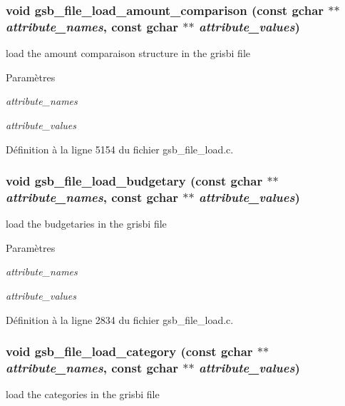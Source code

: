 \subsubsection[{gsb\_\-file\_\-load\_\-amount\_\-comparison}]{\setlength{\rightskip}{0pt plus 5cm}void gsb\_\-file\_\-load\_\-amount\_\-comparison (const gchar $\ast$$\ast$ {\em attribute\_\-names}, \/  const gchar $\ast$$\ast$ {\em attribute\_\-values})}\label{gsb__file__load_8h_a341cc9d8b903c0ab9ecd89bb40fcbae4}
load the amount comparaison structure in the grisbi file


\begin{DoxyParams}{Paramètres}
\item[{\em attribute\_\-names}]\item[{\em attribute\_\-values}]\end{DoxyParams}


Définition à la ligne 5154 du fichier gsb\_\-file\_\-load.c.

\subsubsection[{gsb\_\-file\_\-load\_\-budgetary}]{\setlength{\rightskip}{0pt plus 5cm}void gsb\_\-file\_\-load\_\-budgetary (const gchar $\ast$$\ast$ {\em attribute\_\-names}, \/  const gchar $\ast$$\ast$ {\em attribute\_\-values})}\label{gsb__file__load_8h_a8977ebd1f3ba9972e934abdba45cd0db}
load the budgetaries in the grisbi file


\begin{DoxyParams}{Paramètres}
\item[{\em attribute\_\-names}]\item[{\em attribute\_\-values}]\end{DoxyParams}


Définition à la ligne 2834 du fichier gsb\_\-file\_\-load.c.

\subsubsection[{gsb\_\-file\_\-load\_\-category}]{\setlength{\rightskip}{0pt plus 5cm}void gsb\_\-file\_\-load\_\-category (const gchar $\ast$$\ast$ {\em attribute\_\-names}, \/  const gchar $\ast$$\ast$ {\em attribute\_\-values})}\label{gsb__file__load_8h_aa24a461612b4aba269fd1d1cd820f794}
load the categories in the grisbi file


